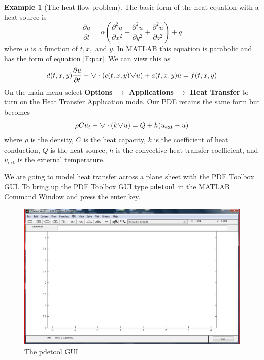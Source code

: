 \documentclass{amsart}
\theoremstyle{definition}
\newtheorem{example}{Example}
\begin{document}
\begin{example}[The heat flow problem]

The basic form of the heat equation with a heat source is 
\begin{equation}
\frac{\partial u}{\partial t} = \alpha \left( \frac{\partial ^2 u}{\partial x^2} + \frac{\partial ^2 u}{\partial y^2} + \frac{\partial ^2 u}{\partial z^2}    \right) + q
\end{equation}
where $u$ is a function of $t,x, \text{ and } y$. In MATLAB this equation is parabolic and has the form of equation \eqref{E:par}. We can view this as 
\begin{equation}
d(t,x,y) \frac{\partial u}{\partial t} -\raisebox{.4ex}{$\bigtriangledown$} \cdot (c(t,x,y) \raisebox{.4ex}{$\bigtriangledown$} u) + a(t,x,y) u = f(t,x,y)
\end{equation}
On the main menu select \textbf{Options $\to$ Applications $\to$ Heat Transfer} to turn on the Heat Transfer Application mode. Our PDE retains the same form but becomes
\begin{equation}
\rho  C  u_t -\raisebox{.4ex}{$\bigtriangledown$} \cdot (k \raisebox{.4ex}{$\bigtriangledown$} u) = Q + h(u_{\text{ext}} - u)
\end{equation}
where $\rho$ is the density, $C$ is the heat capacity, $k$ is the coefficient of heat conduction, $Q$ is the heat source, $h$ is the convective heat transfer coefficient, and $u_{\text{ext}}$ is the external temperature.

We are going to model heat transfer across a plane sheet with the PDE Toolbox GUI. To bring up the PDE Toolbox GUI type \texttt{pdetool} in the MATLAB Command Window and press the enter key. 

\begin{figure}[ht]
   \includegraphics[height = 3 in]{pdetoolGUI}
   \caption{The pdetool GUI}
\end{figure}


\end{example}
\end{document}

